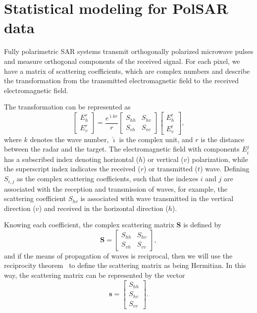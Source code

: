 \documentclass[conference]{IEEEtran}
\begin{document}
\section{Statistical modeling for PolSAR data}\label{sec_02}

Fully polarimetric SAR systems transmit orthogonally polarized microwave pulses and measure orthogonal components of the received signal. 
For each pixel, we have a matrix of scattering coefficients, which are complex numbers and describe the transformation from the transmitted electromagnetic field to the received electromagnetic field.

The transformation can be represented as
\begin{equation*}
 \left[
\begin{array}{c}
	E_{h}^{r}   \\
	E_{v}^{r}    
\end{array}
\right]
 = \frac{e^{\hat{\imath} kr}}{r}\left[
\begin{array}{cc}
	S_{hh}   & S_{hv}   \\
	S_{vh}   & S_{vv}   
\end{array}
\right]
 \left[
\begin{array}{c}
	E_{h}^{t}   \\
	E_{v}^{t}    
\end{array}
\right],
\end{equation*}
where $k$ denotes the wave number, $\hat{\imath}$ is the complex unit, and $r$ is the distance between the radar and the target. 
The electromagnetic field with components $E_{i}^{j}$ has a subscribed index denoting horizontal ($h$) or vertical ($v$) polarization, while the superscript index indicates the received ($r$) or transmitted ($t$) wave. 
Defining $S_{i,j}$ as the complex scattering coefficients, such that the indexes $i$ and $j$ are associated with the reception and transmission of waves, for example, the scattering coefficient $S_{hv}$ is associated with wave transmitted in the vertical direction ($v$) and received in the horizontal direction ($h$).

Knowing each coefficient, the complex scattering matrix $\mathbf{S}$ is defined by
\begin{equation}\label{eq_01}
\mathbf{S} = \left[
\begin{array}{cc}
	S_{hh}   & S_{hv}   \\
	S_{vh}   & S_{vv}   
\end{array}
\right],
\end{equation}
and if the means of propagation of waves is reciprocal, then we will use the reciprocity theorem~\cite{lp} to define the scattering matrix as being Hermitian. 
In this way, the scattering matrix can be represented by the vector
\begin{equation}\label{eq_02}
\mathbf{s} = \left[
\begin{array}{c}
	S_{hh}     \\
    S_{hv}     \\
	S_{vv}    
\end{array}
\right].
\end{equation}
\end{document}
